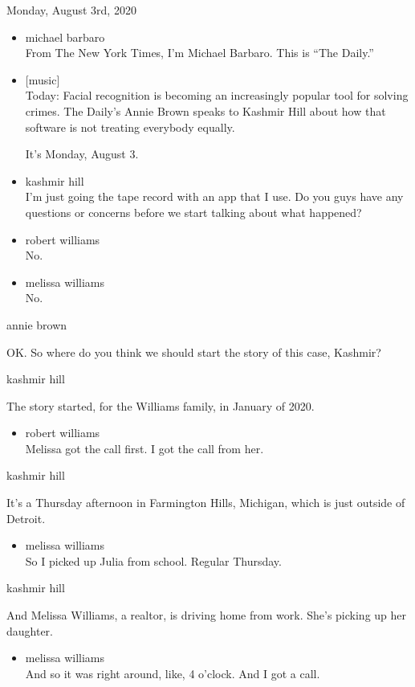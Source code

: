 Monday, August 3rd, 2020

\begin{itemize}
\item
  michael barbaro\\
  From The New York Times, I'm Michael Barbaro. This is ``The Daily.''
\item
  {[}music{]}\\
  Today: Facial recognition is becoming an increasingly popular tool for
  solving crimes. The Daily's Annie Brown speaks to Kashmir Hill about
  how that software is not treating everybody equally.

  It's Monday, August 3.
\item
  kashmir hill\\
  I'm just going the tape record with an app that I use. Do you guys
  have any questions or concerns before we start talking about what
  happened?
\item
  robert williams\\
  No.
\item
  melissa williams\\
  No.
\end{itemize}

annie brown

OK. So where do you think we should start the story of this case,
Kashmir?

kashmir hill

The story started, for the Williams family, in January of 2020.

\begin{itemize}
\tightlist
\item
  robert williams\\
  Melissa got the call first. I got the call from her.
\end{itemize}

kashmir hill

It's a Thursday afternoon in Farmington Hills, Michigan, which is just
outside of Detroit.

\begin{itemize}
\tightlist
\item
  melissa williams\\
  So I picked up Julia from school. Regular Thursday.
\end{itemize}

kashmir hill

And Melissa Williams, a realtor, is driving home from work. She's
picking up her daughter.

\begin{itemize}
\tightlist
\item
  melissa williams\\
  And so it was right around, like, 4 o'clock. And I got a call.
\end{itemize}

